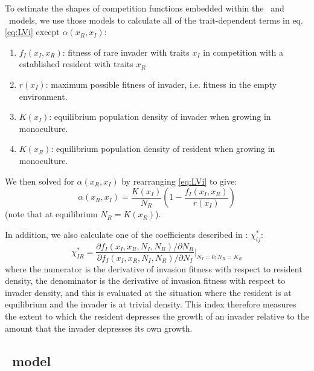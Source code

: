 \documentclass[a4paper,11pt]{article}
\begin{document}
To estimate the shapes of competition functions embedded within the
\Rstar\ and \plant\ models, we use those models to calculate all of
the trait-dependent terms in eq. \ref{eq:LVi} except $\alpha(x_R,
x_I)$:
\begin{enumerate}
\item $f_I(x_I, x_R)$: fitness of rare invader with traits $x_I$  in
  competition with a established resident with traits $x_R$
\item $r(x_I)$: maximum possible fitness of invader, i.e. fitness in
  the empty environment.
\item $K(x_I)$: equilibrium population density of invader when growing
  in monoculture.
\item $K(x_R)$: equilibrium population density of resident when
  growing in monoculture.
\end{enumerate}
We then solved for $\alpha(x_R, x_I)$ by rearranging  \ref{eq:LVi} to give:
\begin{equation}
  \label{eq:alpha}
  \alpha(x_R, x_I) = \frac{K(x_I)}{N_R}
  \left(1 - \frac{f_I(x_I, x_R)}{r(x_I)}\right)
\end{equation}
(note that at equilibrium $N_R = K(x_R)$).

In addition, we also calculate one of the coefficients described in
\citet{Abrams-2008}: $\chi_{ij}^{*}$:
%
\begin{equation}
  \label{eq:abrams-coef}
  \chi_{IR}^{*} =
  \frac{\partial f_I(x_I, x_R, N_I, N_R) /  \partial N_R}%
  {\partial f_I(x_I, x_R, N_I, N_R) / \partial N_I}
  \bigg|_{N_I=0; N_R=K_{R}}
\end{equation}
%
where the numerator is the derivative of invasion fitness with respect
to resident density, the denominator is the derivative of invasion
fitness with respect to invader density, and this is evaluated at the
situation where the resident is at equilibrium and the invader is at
trivial density.  This index therefore measures the extent to which
the resident depresses the growth of an invader relative to the amount
that the invader depresses its own growth.

\subsection{\Rstar\ model}

\end{document}

